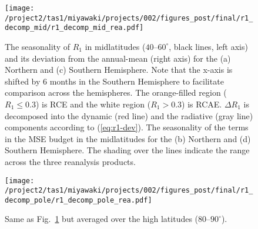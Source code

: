 \documentclass{ametsocV5}
\begin{document}

\begin{figure}[t]
  \noindent\texttt{[image: /project2/tas1/miyawaki/projects/002/figures\_post/final/r1\_decomp\_mid/r1\_decomp\_mid\_rea.pdf]}\\
  \caption{The seasonality of $R_{1}$ in midlatitudes ($40$--$60^{\circ}$, black lines, left axis) and its deviation from the annual-mean (right axis) for the (a) Northern and (c) Southern Hemisphere. Note that the x-axis is shifted by 6 months in the Southern Hemisphere to facilitate comparison across the hemispheres. The orange-filled region ($R_1 \le 0.3$) is RCE and the white region ($R_1>0.3$) is RCAE. $\Delta R_1$ is decomposed into the dynamic (red line) and the radiative (gray line) components according to (\ref{eq:r1-dev}). The seasonality of the terms in the MSE budget in the midlatitudes for the (b) Northern and (d) Southern Hemisphere. The shading over the lines indicate the range across the three reanalysis products.}
  \label{fig:rea-r1-decomp-mid}
\end{figure}

\begin{figure}[t]
  \noindent\texttt{[image: /project2/tas1/miyawaki/projects/002/figures\_post/final/r1\_decomp\_pole/r1\_decomp\_pole\_rea.pdf]}\\
  \caption{Same as Fig.~\ref{fig:rea-r1-decomp-mid} but averaged over the high latitudes ($80$--$90^{\circ}$).}
  \label{fig:rea-r1-decomp-pole}
\end{figure}
\end{document}
